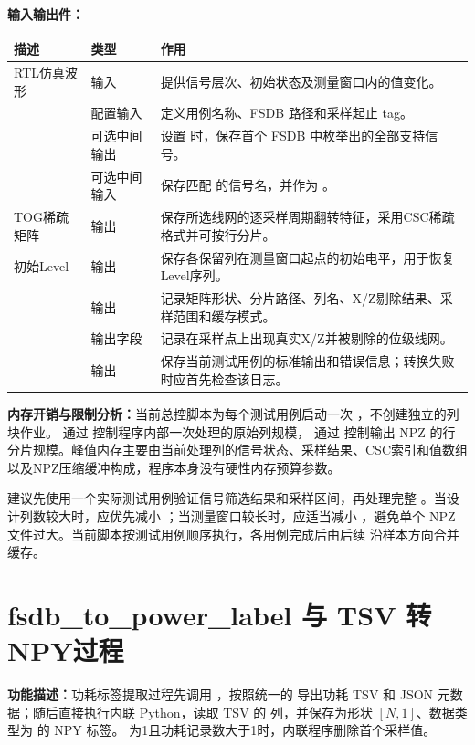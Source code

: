 \textbf{输入输出件：}
\begin{longtable}{L{0.32\textwidth}L{0.13\textwidth}L{0.43\textwidth}}
\toprule 描述 & 类型 & 作用 \\ \midrule
RTL仿真波形  & 输入 & 提供信号层次、初始状态及测量窗口内的值变化。 \\
 & 配置输入 & 定义用例名称、FSDB 路径和采样起止 tag。 \\
 & 可选中间输出 & 设置  时，保存首个 FSDB 中枚举出的全部支持信号。 \\
 & 可选中间输入 & 保存匹配  的信号名，并作为 。 \\
TOG稀疏矩阵  & 输出 & 保存所选线网的逐采样周期翻转特征，采用CSC稀疏格式并可按行分片。 \\
初始Level  & 输出 & 保存各保留列在测量窗口起点的初始电平，用于恢复Level序列。 \\
 & 输出 & 记录矩阵形状、分片路径、列名、X/Z剔除结果、采样范围和缓存模式。 \\
 & 输出字段 & 记录在采样点上出现真实X/Z并被剔除的位级线网。 \\
 & 输出 & 保存当前测试用例的标准输出和错误信息；转换失败时应首先检查该日志。 \\
\bottomrule
\end{longtable}

\textbf{内存开销与限制分析：}当前总控脚本为每个测试用例启动一次 ，不创建独立的列块作业。 通过  控制程序内部一次处理的原始列规模， 通过  控制输出 NPZ 的行分片规模。峰值内存主要由当前处理列的信号状态、采样结果、CSC索引和值数组以及NPZ压缩缓冲构成，程序本身没有硬性内存预算参数。

建议先使用一个实际测试用例验证信号筛选结果和采样区间，再处理完整 。当设计列数较大时，应优先减小 ；当测量窗口较长时，应适当减小 ，避免单个 NPZ 文件过大。当前脚本按测试用例顺序执行，各用例完成后由后续  沿样本方向合并缓存。


\section{fsdb\_to\_power\_label 与 TSV 转 NPY过程}

\textbf{功能描述：}功耗标签提取过程先调用 ，按照统一的  导出功耗 TSV 和 JSON 元数据；随后直接执行内联 Python，读取 TSV 的  列，并保存为形状 $[N,1]$、数据类型为  的 NPY 标签。 为1且功耗记录数大于1时，内联程序删除首个采样值。


